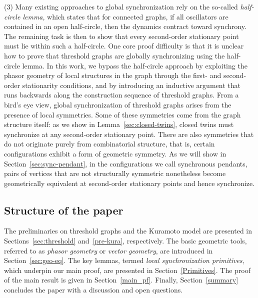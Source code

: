 \documentclass[11pt,reqno]{amsart}
\theoremstyle{definition}
\begin{document}
\noindent
(3) Many existing approaches to global synchronization rely on the so-called \textit{half-circle lemma}, which states that for connected graphs, if all oscillators are contained in an open half-circle, then the dynamics contract toward synchrony. The remaining task is then to show that every second-order stationary point must lie within such a half-circle. One core proof difficulty is that it is unclear how to prove that threshold graphs are globally synchronizing using the half-circle lemma. In this work, we bypass the half-circle approach by exploiting the phasor geometry of local structures in the graph through the first- and second-order stationarity conditions, and by introducing an inductive argument that runs backwards along the construction sequence of threshold graphs.
From a bird's eye view, global synchronization of threshold graphs arises from the presence of local symmetries. Some of these symmetries come from the graph structure itself: as we show in Lemma~\ref{sec:closed-twins}, closed twins must synchronize at any second-order stationary point.
There are also symmetries that do not originate purely from combinatorial structure, that is, certain configurations exhibit a form of geometric symmetry. As we will show in Section~\ref{sec:sync-pendant}, in the configurations we call synchronous pendants, pairs of vertices that are not structurally symmetric nonetheless become geometrically equivalent at second-order stationary points and hence synchronize.

\subsection{Structure of the paper}
The preliminaries on threshold graphs and the Kuramoto model are presented in Sections~\ref{sec:threshold} and~\ref{pre-kura}, respectively.
The basic geometric tools, referred to as \emph{phasor geometry} or \emph{vector geometry}, are introduced in Section~\ref{sec:geo-eq}.
The key lemmas, termed \emph{local synchronization primitives}, which underpin our main proof, are presented in Section~\ref{Primitives}.
The proof of the main result is given in Section~\ref{main_pf}.
Finally, Section~\ref{summary} concludes the paper with a discussion and open questions.
\end{document}
